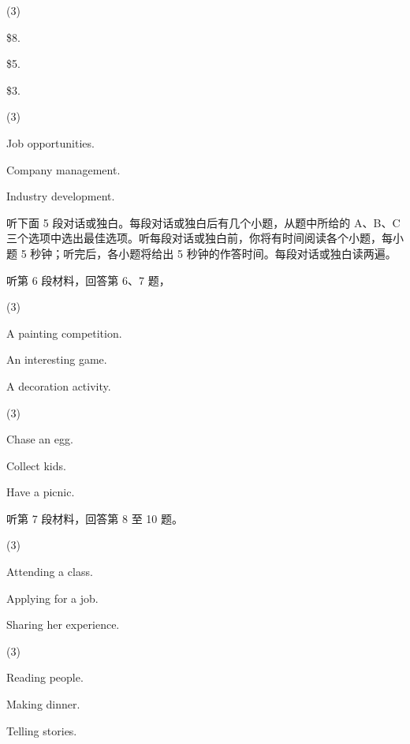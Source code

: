 \documentclass{英语试卷}
\begin{document}
\begin{choices}(3)
  \item \$8.
  \item \$5.
  \item \$3.
\end{choices}
\begin{choices}(3)
  \item Job opportunities.
  \item Company management.
  \item Industry development.
\end{choices}
\par 听下面 5 段对话或独白。每段对话或独白后有几个小题，从题中所给的 A、B、C 三个选项中选出最佳选项。听每段对话或独白前，你将有时间阅读各个小题，每小题 5 秒钟；听完后，各小题将给出 5 秒钟的作答时间。每段对话或独白读两遍。\par
\par 听第 6 段材料，回答第 6、7 题，\par
{}
\begin{choices}(3)
  \item A painting competition.
  \item An interesting game.
  \item A decoration activity.
\end{choices}
\begin{choices}(3)
  \item Chase an egg.
  \item Collect kids.
  \item Have a picnic.
\end{choices}
\par 听第 7 段材料，回答第 8 至 10 题。\par
{}
\begin{choices}(3)
  \item Attending a class.
  \item Applying for a job.
  \item Sharing her experience.
\end{choices}
\begin{choices}(3)
  \item Reading people.
  \item Making dinner.
  \item Telling stories.
\end{choices}
\end{document}

